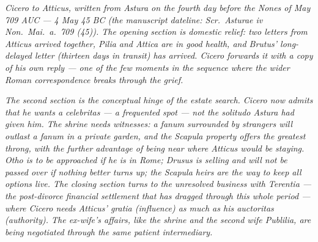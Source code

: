 
\textit{Cicero to Atticus, written from Astura on the
fourth day before the Nones of May 709 AUC --- 4 May
45 BC (the manuscript dateline: \textit{Scr.\ Asturae
iv Non.\ Mai.\ a.\ 709 (45)}). The opening section is
domestic relief: two letters from Atticus arrived
together, Pilia and Attica are in good health, and
Brutus' long-delayed letter (thirteen days in
transit) has arrived. Cicero forwards it with a copy
of his own reply --- one of the few moments in the
sequence where the wider Roman correspondence breaks
through the grief.}

\textit{The second section is the conceptual hinge of
the estate search. Cicero now admits that he wants a
\textit{celebritas} --- a frequented spot --- not the
\textit{solitudo} Astura had given him. The shrine
needs witnesses: a \textit{fanum} surrounded by
strangers will outlast a \textit{fanum} in a private
garden, and the Scapula property offers the greatest
throng, with the further advantage of being near
where Atticus would be staying. Otho is to be
approached if he is in Rome; Drusus is selling and
will not be passed over if nothing better turns up;
the Scapula heirs are the way to keep all options
live. The closing section turns to the unresolved business
with Terentia --- the post-divorce financial settlement
that has dragged through this whole period --- where
Cicero needs Atticus' \textit{gratia} (influence) as
much as his \textit{auctoritas} (authority). The
ex-wife's affairs, like the shrine and the second
wife Publilia, are being negotiated through the same
patient intermediary.}
